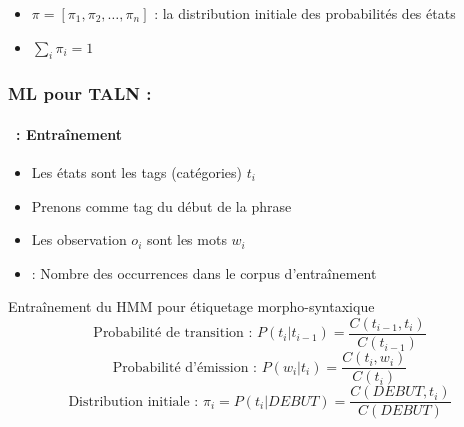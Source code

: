 \documentclass[xcolor=table]{beamer}
\begin{document}
\begin{frame}
\begin{minipage}{.45\textwidth}
		\end{minipage}
		
		\begin{itemize}
			\item $\pi = [\pi_1, \pi_2, \ldots, \pi_n ]$ : la distribution initiale des probabilités des états
			\item $\sum_i \pi_i = 1$
		\end{itemize}
		
	\end{frame}
	
	\begin{frame}
		\frametitle{ML pour TALN : \insertsection}
		\framesubtitle{\insertsubsection\ : Entraînement}
		
		\begin{itemize}
			\item Les états sont les tags (catégories) $t_i$
			\item Prenons  comme tag du début de la phrase
			\item Les observation $o_i$ sont les mots $w_i$
			\item {} : Nombre des occurrences dans le corpus d'entraînement
		\end{itemize}
		
		\begin{block}{Entraînement du HMM pour étiquetage morpho-syntaxique}
			\[
			\text{Probabilité de transition : } P(t_i | t_{i-1}) = \frac{C(t_{i-1}, t_i)}{C(t_{i-1})} 
			\]\[
			\text{Probabilité d'émission : } P(w_i | t_i) = \frac{C(t_i, w_i)}{C(t_i)}
			\]\[
			\text{Distribution initiale : } \pi_i = P(t_i | DEBUT) = \frac{C(DEBUT, t_i)}{C(DEBUT)}
			\]
			
		\end{block}
	\end{frame}
	
\end{document}
